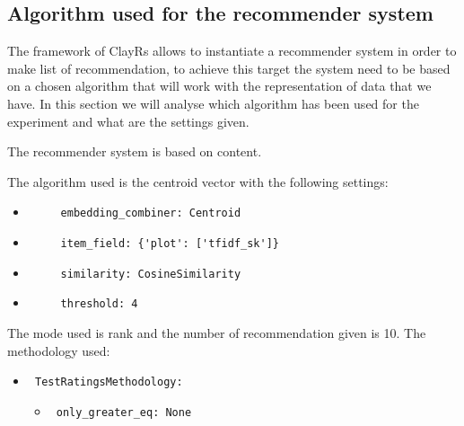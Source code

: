 \documentclass[11pt]{article}
\begin{document}


\subsection{Algorithm used for the recommender system}\label{subsec:algo}
The framework of ClayRs allows to instantiate a recommender system in order to make list of recommendation, to achieve
this target the system need to be based on a chosen algorithm that will work with the representation of data that
we have.
In this section we will analyse which algorithm has been used for the experiment and what are the settings
given.
\hfill\break
\hfill\break

The recommender system is based on content.
\hfill\break
\hfill\break



The algorithm used is the centroid vector with the following settings:
\begin{itemize}
        \item \begin{verbatim}
     embedding_combiner: Centroid
\end{verbatim}
    \item \begin{verbatim}
     item_field: {'plot': ['tfidf_sk']}
\end{verbatim}
    \item \begin{verbatim}
     similarity: CosineSimilarity
\end{verbatim}
    \item \begin{verbatim}
     threshold: 4
\end{verbatim}
\end{itemize}
\hfill\break
\hfill\break
The mode used is rank and the number of recommendation given is
10.
The methodology used:
\begin{itemize}
    \item
     \verb| TestRatingsMethodology:|
     \begin{itemize}
            \item
            \verb| only_greater_eq: None |
          \end{itemize}
\end{itemize}
\hfill\break
\hfill\break
\end{document}
